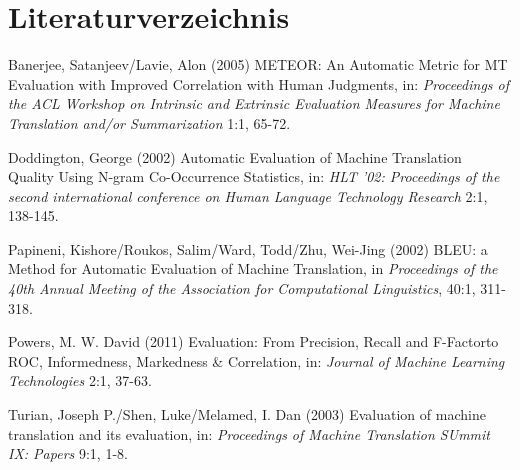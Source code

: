 \documentclass[12pt]{report}
\begin{document}
\section*{Literaturverzeichnis}
	\begin{hangparas}{.25in}{1}
	Banerjee, Satanjeev/Lavie, Alon (2005) \glqq METEOR: An Automatic Metric for MT Evaluation with Improved Correlation with Human Judgments\grqq, in: \textit{Proceedings of the ACL Workshop on Intrinsic and Extrinsic Evaluation Measures for Machine Translation and/or Summarization} 1:1, 65-72. \\
	\end{hangparas}
	\begin{hangparas}{.25in}{1}
	Doddington, George (2002) \glqq Automatic Evaluation of Machine Translation Quality Using N-gram Co-Occurrence Statistics\grqq, in: \textit{HLT '02: Proceedings of the second international conference on Human Language Technology Research} 2:1, 138-145. \\
	\end{hangparas}
	\begin{hangparas}{.25in}{1}
	Papineni, Kishore/Roukos, Salim/Ward, Todd/Zhu, Wei-Jing (2002) \glqq BLEU: a Method for Automatic Evaluation of Machine Translation\grqq, in \textit{Proceedings of the 40th Annual Meeting of the Association for Computational Linguistics}, 40:1, 311-318. \\
	\end{hangparas}
	\begin{hangparas}{.25in}{1}
	Powers, M. W. David (2011) \glqq Evaluation: From Precision, Recall and F-Factorto ROC, Informedness, Markedness \& Correlation\grqq, in: \textit{Journal of Machine Learning Technologies} 2:1, 37-63. \\
	\end{hangparas}
	\begin{hangparas}{.25in}{1}
	Turian, Joseph P./Shen, Luke/Melamed, I. Dan (2003) \glqq Evaluation of machine translation and its evaluation\grqq, in: \textit{Proceedings of Machine Translation SUmmit IX: Papers} 9:1, 1-8. \\
	\end{hangparas}
\end{document}
